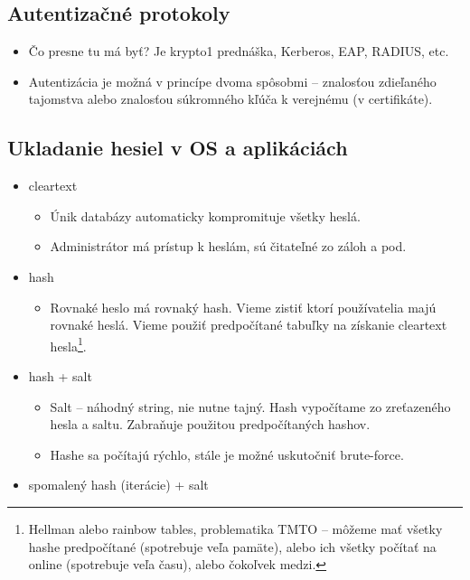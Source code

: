 \documentclass[12pt,a4paper]{article}
\begin{document}
{    \subsection{Autentizačné protokoly}
    \begin{itemize}
        \item Čo presne tu má byť? Je krypto1 prednáška, Kerberos, EAP, RADIUS, etc.
        \item Autentizácia je možná v princípe dvoma spôsobmi -- znalosťou zdieľaného tajomstva alebo znalosťou súkromného kľúča k verejnému (v certifikáte).
    \end{itemize}
    \subsection{Ukladanie hesiel v OS a aplikáciách}
    \begin{itemize}
            \item cleartext
            \begin{itemize}
                \item Únik databázy automaticky kompromituje všetky heslá.
                \item Administrátor má prístup k heslám, sú čitateľné zo záloh a pod.
            \end{itemize}
            \item hash
            \begin{itemize}
                \item Rovnaké heslo má rovnaký hash. Vieme zistiť ktorí používatelia majú rovnaké heslá. Vieme použiť predpočítané tabuľky na získanie cleartext hesla\footnote{Hellman alebo rainbow tables, problematika TMTO -- môžeme mať všetky hashe predpočítané (spotrebuje veľa pamäte), alebo ich všetky počítať na online (spotrebuje veľa času), alebo čokoľvek medzi. }.
            \end{itemize}
            \item hash + salt
            \begin{itemize}
                \item Salt -- náhodný string, nie nutne tajný. Hash vypočítame zo zreťazeného hesla a saltu. Zabraňuje použitou predpočítaných hashov.
                \item Hashe sa počítajú rýchlo, stále je možné uskutočniť brute-force.
            \end{itemize}
            \item spomalený hash (iterácie) + salt
            \begin{itemize}

\end{itemize}
\end{itemize}}
\end{document}
